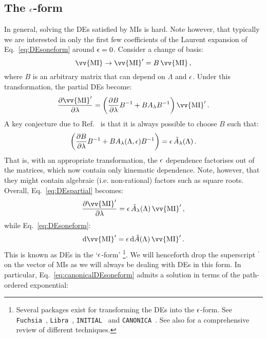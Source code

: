 \documentclass[main.tex]{subfiles}
\begin{document}
\subsection{The $\epsilon$-form} \label{sec:canonicalform}
In general, solving the DEs satisfied by MIs is hard. Note however, that typically we are interested in only the first few coefficients of the Laurent expansion of Eq.~\ref{eq:DEsoneform} around $\epsilon=0$. Consider a change of basis:
\begin{equation} \label{eq:basistransformation}
    \vv{\text{MI}} \rightarrow \vv{\text{MI}}^\prime = B\,\vv{\text{MI}}\,,
\end{equation}
where $B$ is an arbitrary matrix that can depend on $\Lambda$ and $\epsilon$. Under this transformation, the partial DEs become:
\begin{equation}
    \frac{\partial \vv{\text{MI}}^\prime}{\partial \lambda} = \left( \frac{\partial B}{\partial \lambda}B^{-1} + B A_{\lambda} B^{-1} \right) \vv{\text{MI}}^\prime\,.
\end{equation}
A key conjecture due to Ref.~\cite{Henn:2013pwa} is that it is always possible to choose $B$ such that:
\begin{equation}
    \left( \frac{\partial B}{\partial \lambda}B^{-1} + B A_{\lambda}(\Lambda, \epsilon) B^{-1} \right) = \epsilon \, \tilde{A}_{\lambda}(\Lambda)\,.
\end{equation}
That is, with an appropriate transformation, the $\epsilon$ dependence factorises out of the matrices, which now contain only kinematic dependence. Note, however, that they might contain algebraic (i.e. non-rational) factors such as square roots. Overall, Eq.~\ref{eq:DEspartial} becomes:
\begin{equation} \label{eq:canonicalDEspartial}
    \frac{\partial \vv{\text{MI}}^\prime}{\partial \lambda} = \eps \, \tilde{A}_{\lambda}(\Lambda) \, \vv{\text{MI}}^\prime\,, 
\end{equation}
while Eq.~\ref{eq:DEsoneform}:
\begin{equation} \label{eq:canonicalDEsoneform}
    \dd \vv{\text{MI}}^\prime = \eps \, \dd \tilde{A}(\Lambda) \,\vv{\text{MI}}^\prime\,.
\end{equation}
This is known as DEs in the `$\epsilon$-form' \footnote{Several packages exist for transforming the DEs into the $\epsilon$-form. See \texttt{Fuchsia}~\cite{Gituliar:2017vzm}, \texttt{Libra}~\cite{Lee:2020zfb}, \texttt{INITIAL}~\cite{Dlapa:2020cwj} and \texttt{CANONICA}~\cite{Meyer:2018feh}. See also \cite{Dlapa:2022nct} for a comprehensive review of different techniques.}. We will henceforth drop the superscript $^\prime$ on the vector of MIs as we will always be dealing with DEs in this form. In particular, Eq.~\ref{eq:canonicalDEsoneform} admits a solution in terms of the path-ordered exponential:
\end{document}
